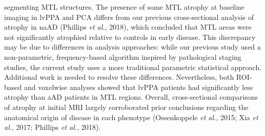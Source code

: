 \documentclass[]{article}
\begin{document}
segmenting MTL structures. The presence of some MTL atrophy at baseline
imaging in lvPPA and PCA differs from our previous cross-sectional
analysis of atrophy in naAD (Phillips \emph{et al.}, 2018), which
concluded that MTL areas were not significantly atrophied relative to
controls in early disease. This discrepancy may be due to differences in
analysis approaches: while our previous study used a non-parametric,
frequency-based algorithm inspired by pathological staging studies, the
current study uses a more traditional parametric statistical approach.
Additional work is needed to resolve these differences. Nevertheless,
both ROI-based and voxelwise analyses showed that lvPPA patients had
significantly less atrophy than aAD patients in MTL regions. Overall,
cross-sectional comparisons of atrophy at initial MRI largely
corroborated prior conclusions regarding the anatomical origin of
disease in each phenotype (Ossenkoppele \emph{et al.}, 2015; Xia
\emph{et al.}, 2017; Phillips \emph{et al.}, 2018).
\end{document}
